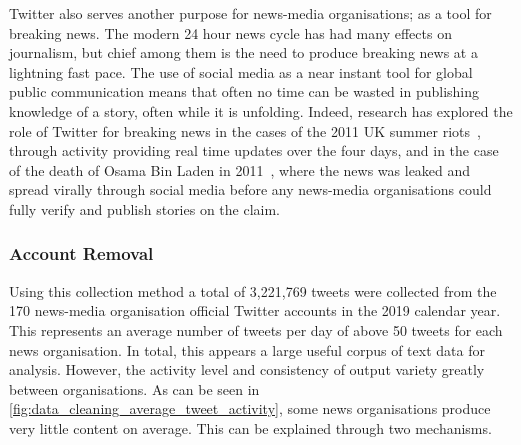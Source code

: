 Twitter also serves another purpose for news-media organisations; as a tool for breaking news. The modern 24 hour news cycle has had many effects on journalism, but chief among them is the need to produce breaking news at a lightning fast pace. The use of social media as a near instant tool for global public communication means that often no time can be wasted in publishing knowledge of a story, often while it is unfolding. Indeed, research has explored the role of Twitter for breaking news in the cases of the 2011 UK summer riots~\cite{vis_twitter_2013}, through activity providing real time updates over the four days, and in the case of the death of Osama Bin Laden in 2011~\cite{hu_breaking_2012}, where the news was leaked and spread virally through social media before any news-media organisations could fully verify and publish stories on the claim. %

\subsubsection{Account Removal}
Using this collection method a total of 3,221,769 tweets were collected from the 170 news-media organisation official Twitter accounts in the 2019 calendar year. This represents an average number of tweets per day of above 50 tweets for each news organisation. In total, this appears a large useful corpus of text data for analysis. However, the activity level and consistency of output variety greatly between organisations. As can be seen in \autoref{fig:data_cleaning_average_tweet_activity}, some news organisations produce very little content on average. This can be explained through two mechanisms.

